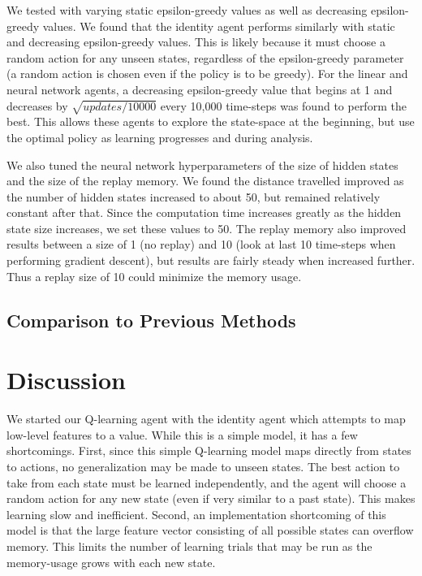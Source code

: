 \documentclass[12pt]{article}
\begin{document}
We tested with varying static epsilon-greedy values as well as decreasing epsilon-greedy values. We found that the identity agent performs similarly with static and decreasing epsilon-greedy values. This is likely because it must choose a random action for any unseen states, regardless of the epsilon-greedy parameter (a random action is chosen even if the policy is to be greedy). For the linear and neural network agents, a decreasing epsilon-greedy value that begins at 1 and decreases by $\sqrt{updates / 10000}$ every 10,000 time-steps was found to perform the best. This allows these agents to explore the state-space at the beginning, but use the optimal policy as learning progresses and during analysis.

We also tuned the neural network hyperparameters of the size of hidden states and the size of the replay memory. We found the distance travelled improved as the number of hidden states increased to about 50, but remained relatively constant after that. Since the computation time increases greatly as the hidden state size increases, we set these values to 50. The replay memory also improved results between a size of 1 (no replay) and 10 (look at last 10 time-steps when performing gradient descent), but results are fairly steady when increased further. Thus a replay size of 10 could minimize the memory usage.

\subsection{Comparison to Previous Methods}

\section{Discussion}

We started our Q-learning agent with the identity agent which attempts to map low-level features to a value. While this is a simple model, it has a few shortcomings. First, since this simple Q-learning model maps directly from states to actions, no generalization may be made to unseen states. The best action to take from each state must be learned independently, and the agent will choose a random action for any new state (even if very similar to a past state). This makes learning slow and inefficient. Second, an implementation shortcoming of this model is that the large feature vector consisting of all possible states can overflow memory. This limits the number of learning trials that may be run as the memory-usage grows with each new state.
\end{document}
